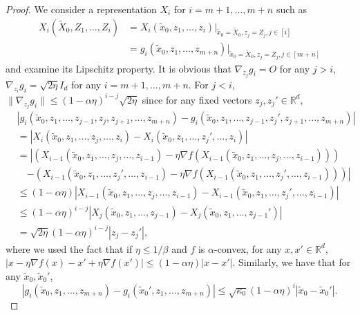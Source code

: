 \documentclass[12pt,reqno]{amsart}
\theoremstyle{remark}
\theoremstyle{definition}
\newcommand{\R}{\mathbb{R}}
\newcommand{\tx}{\tilde{x}}
\newcommand{\tX}{\tilde{X}}
\begin{document}
\begin{proof}
We consider a representation $X_{i}$ for $i=m+1,\ldots,m+n$ such as 
\begin{align*}
    X_{i}(\tX_{0},Z_{1},\ldots,Z_{i})&=X_{i}(\tx_{0},z_{1},\ldots,z_{i})|_{\tx_{0}=\tX_{0},z_{j}=Z_{j},j\in[i]}\\
    &=g_{i}(\tx_{0},z_{1},\ldots,z_{m+n})|_{\tx_{0}=\tX_{0},z_{j}=Z_{j},j\in[m+n]}
\end{align*}
and examine its Lipschitz property.
It is obvious that $\nabla_{z_{j}}g_{i}=O$ for any $j> i$, $\nabla_{z_{i}}g_{i}=\sqrt{2\eta}I_{d}$ for any $i=m+1,\ldots,m+n$.
For $j<i$, $\|\nabla_{z_{j}} g_{i}\|\le (1-\alpha\eta)^{i-j}\sqrt{2\eta}$ since for any fixed vectors $z_{j},z_{j}'\in\R^{d}$,
\begin{align*}
    &|g_{i}(\tx_{0},z_{1},\ldots,z_{j-1},z_{j},z_{j+1},\ldots,z_{m+n})-g_{i}(\tx_{0},z_{1},\ldots,z_{j-1},z_{j}',z_{j+1},\ldots,z_{m+n})|\\
    &=|X_{i}(\tx_{0},z_{1},\ldots,z_{j},\ldots,z_{i})-X_{i}(\tx_{0},z_{1},\ldots,z_{j}',\ldots,z_{i})|\\
    &=\left|\left(X_{i-1}(\tx_{0},z_{1},\ldots,z_{j},\ldots,z_{i-1})-\eta\nabla f(X_{i-1}(\tx_{0},z_{1},\ldots,z_{j},\ldots,z_{i-1}))\right)\right.\\
    &\quad\left.-\left(X_{i-1}(\tx_{0},z_{1},\ldots,z_{j}',\ldots,z_{i-1})-\eta\nabla f(X_{i-1}(\tx_{0},z_{1},\ldots,z_{j}',\ldots,z_{i-1}))\right)\right|\\
    &\le (1-\alpha\eta)|X_{i-1}(\tx_{0},z_{1},\ldots,z_{j},\ldots,z_{i-1})-X_{i-1}(\tx_{0},z_{1},\ldots,z_{j}',\ldots,z_{i-1})|\\
    &\le (1-\alpha\eta)^{i-j}|X_{j}(\tx_{0},z_{1},\ldots,z_{j-1})-X_{j}(\tx_{0},z_{1},\ldots,z_{j-1}')|\\
    &= \sqrt{2\eta}(1-\alpha\eta)^{i-j}|z_{j}-z_{j}'|,
\end{align*}
where we used the fact that if $\eta\le 1/\beta$ and $f$ is $\alpha$-convex, for any $x,x'\in\R^{d}$, $|x-\eta\nabla f(x)-x'+\eta\nabla f(x')|\le (1-\alpha\eta)|x-x'|$.
Similarly, we have that for any $\tx_{0},\tx_{0}'$,
\begin{equation*}
    |g_{i}(\tx_{0},z_{1},\ldots,z_{m+n})-g_{i}(\tx_{0}',z_{1},\ldots,z_{m+n})|\le \sqrt{\kappa_{0}}(1-\alpha\eta)^{i}|\tx_{0}-\tx_{0}'|.
\end{equation*}


\end{proof}
\end{document}
